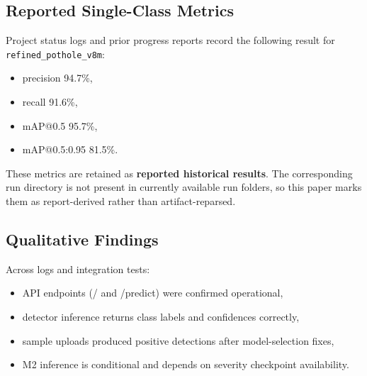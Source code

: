 \documentclass[twocolumn]{article}
\begin{document}
\begin{table}[H]
\centering
\caption{Verified Metrics from Available CSV Runs}
\label{tab:csv_results}
\end{table}

\subsection{Reported Single-Class Metrics}
Project status logs and prior progress reports record the following result for \texttt{refined\_pothole\_v8m}:
\begin{itemize}
    \item precision 94.7\%,
    \item recall 91.6\%,
    \item mAP@0.5 95.7\%,
    \item mAP@0.5:0.95 81.5\%.
\end{itemize}

These metrics are retained as \textbf{reported historical results}. The corresponding run directory is not present in currently available run folders, so this paper marks them as report-derived rather than artifact-reparsed.

\subsection{Qualitative Findings}
Across logs and integration tests:
\begin{itemize}
    \item API endpoints (/ and /predict) were confirmed operational,
    \item detector inference returns class labels and confidences correctly,
    \item sample uploads produced positive detections after model-selection fixes,
    \item M2 inference is conditional and depends on severity checkpoint availability.
\end{itemize}
\end{document}
